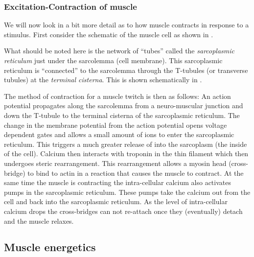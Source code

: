 \subsubsection{Excitation-Contraction of muscle}
\label{sec:excitationcontraction}

We will now look in a bit more detail as to how muscle contracts in response
to a stimulus. First consider the schematic of the muscle cell as shown in
.


What should be noted here is the network of ``tubes'' called the
\emph{sarcoplasmic reticulum} just under the sarcolemma (cell membrane). This
sarcoplasmic reticulum is ``connected'' to the sarcolemma through the
T-tubules (or transverse tubules) at the \emph{terminal cisterna}. This is
shown schematically in .


The method of contraction for a muscle twitch is then as follows: An action
potential propagates along the sarcolemma from a neuro-muscular junction and
down the T-tubule to the terminal cisterna of the sarcoplasmic reticulum.  The
change in the membrane potential from the action potential opens voltage
dependent gates and allows a small amount of  ions to enter the
sarcoplasmic reticulum. This triggers a much greater release of 
into the sarcoplasm (the inside of the cell).  Calcium then interacts with
troponin in the thin filament which then undergoes steric rearrangement.  This
rearrangement allows a myosin head (cross-bridge) to bind to actin in a
reaction that causes the muscle to contract. At the same time the muscle is
contracting the intra-cellular calcium also activates pumps in the
sarcoplasmic reticulum.  These pumps take the calcium out from the cell and
back into the sarcoplasmic reticulum. As the level of intra-cellular calcium
drops the cross-bridges can not re-attach once they (eventually) detach and the
muscle relaxes.

\subsection{Muscle energetics}

